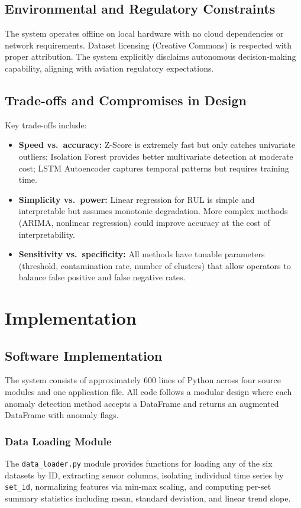\documentclass{CLS_zhou430}
\begin{document}
\section{Environmental and Regulatory Constraints}
The system operates offline on local hardware with no cloud dependencies or network requirements. Dataset licensing (Creative Commons) is respected with proper attribution. The system explicitly disclaims autonomous decision-making capability, aligning with aviation regulatory expectations.

\section{Trade-offs and Compromises in Design}
Key trade-offs include:
\begin{itemize}
    \item \textbf{Speed vs.\ accuracy:} Z-Score is extremely fast but only catches univariate outliers; Isolation Forest provides better multivariate detection at moderate cost; LSTM Autoencoder captures temporal patterns but requires training time.
    \item \textbf{Simplicity vs.\ power:} Linear regression for RUL is simple and interpretable but assumes monotonic degradation. More complex methods (ARIMA, nonlinear regression) could improve accuracy at the cost of interpretability.
    \item \textbf{Sensitivity vs.\ specificity:} All methods have tunable parameters (threshold, contamination rate, number of clusters) that allow operators to balance false positive and false negative rates.
\end{itemize}


\chapter{Implementation}

\section{Software Implementation}
The system consists of approximately 600 lines of Python across four source modules and one application file. All code follows a modular design where each anomaly detection method accepts a DataFrame and returns an augmented DataFrame with anomaly flags.

\subsection{Data Loading Module}
The \texttt{data\_loader.py} module provides functions for loading any of the six datasets by ID, extracting sensor columns, isolating individual time series by \texttt{set\_id}, normalizing features via min-max scaling, and computing per-set summary statistics including mean, standard deviation, and linear trend slope.
\end{document}
